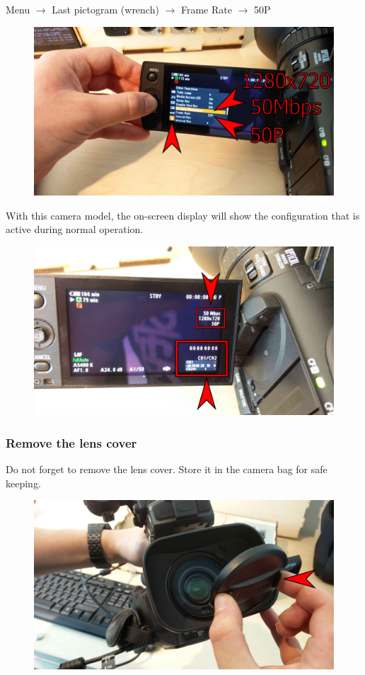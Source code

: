 \documentclass{article}
\begin{document}
Menu $\rightarrow$ Last pictogram (wrench) $\rightarrow$ Frame Rate $\rightarrow$ 50P

\begin{figure}[H]
  \centering
\includegraphics[width = 120mm]{Canon05.jpg}
\end{figure}

With this camera model, the on-screen display will show the configuration that is active during normal operation.
\begin{figure}[H]
  \centering
\includegraphics[width = 120mm]{Canon06.jpg}
\end{figure}

\subsubsection{Remove the lens cover}
Do not forget to remove the lens cover. Store it in the camera bag for safe keeping.

\begin{figure}[H]
  \centering
\includegraphics[width = 120mm]{Canon07.jpg}
\end{figure}
\end{document}
